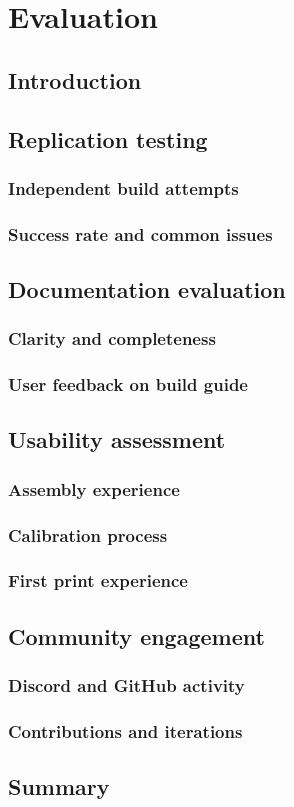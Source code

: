 \chapter{Evaluation}
\label{chap:evaluation}

\section{Introduction}
\label{sec:eval-intro}

\section{Replication testing}
\label{sec:eval-replication}

\subsection{Independent build attempts}
\subsection{Success rate and common issues}

\section{Documentation evaluation}
\label{sec:eval-documentation}

\subsection{Clarity and completeness}
\subsection{User feedback on build guide}

\section{Usability assessment}
\label{sec:eval-usability}

\subsection{Assembly experience}
\subsection{Calibration process}
\subsection{First print experience}

\section{Community engagement}
\label{sec:eval-community}

\subsection{Discord and GitHub activity}
\subsection{Contributions and iterations}

\section{Summary}
\label{sec:eval-summary}
